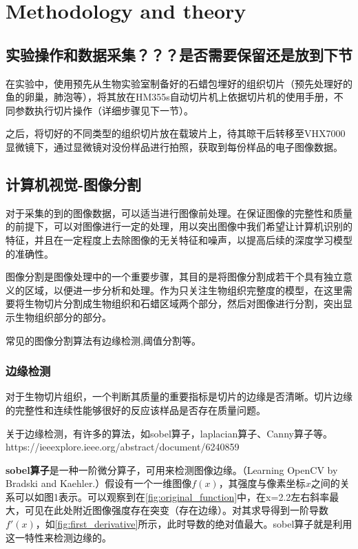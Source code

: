 \section{Methodology and theory}
\label{sec:problem_description}
\subsection{实验操作和数据采集？？？是否需要保留还是放到下节}

在实验中，使用预先从生物实验室制备好的石蜡包埋好的组织切片（预先处理好的鱼的卵巢，肺泡等），将其放在HM355s自动切片机上依据切片机的使用手册，不同参数执行切片操作（详细步骤见下一节）。

之后，将切好的不同类型的组织切片放在载玻片上，待其晾干后转移至VHX7000显微镜下，通过显微镜对没份样品进行拍照，获取到每份样品的电子图像数据。

\subsection{计算机视觉-图像分割}

对于采集的到的图像数据，可以适当进行图像前处理。在保证图像的完整性和质量的前提下，可以对图像进行一定的处理，用以突出图像中我们希望让计算机识别的特征，并且在一定程度上去除图像的无关特征和噪声，以提高后续的深度学习模型的准确性。

图像分割是图像处理中的一个重要步骤，其目的是将图像分割成若干个具有独立意义的区域，以便进一步分析和处理。作为只关注生物组织完整度的模型，在这里需要将生物切片分割成生物组织和石蜡区域两个部分，然后对图像进行分割，突出显示生物组织部分的部分。

常见的图像分割算法有边缘检测,阈值分割等。

\subsubsection{边缘检测}
对于生物切片组织，一个判断其质量的重要指标是切片的边缘是否清晰。切片边缘的完整性和连续性能够很好的反应该样品是否存在质量问题。

关于边缘检测，有许多的算法，如sobel算子，laplacian算子、Canny算子等。https://ieeexplore.ieee.org/abstract/document/6240859

\textbf{sobel算子}是一种一阶微分算子，可用来检测图像边缘。（Learning OpenCV by Bradski and Kaehler.）假设有一个一维图像$f(x)$，其强度与像素坐标$x$之间的关系可以如图1表示。可以观察到在\autoref{fig:original_function}中，在x=2.2左右斜率最大，可见在此处附近图像强度存在突变（存在边缘）。对其求导得到一阶导数$f'(x)$，如\autoref{fig:first_derivative}所示，此时导数的绝对值最大。sobel算子就是利用这一特性来检测边缘的。

